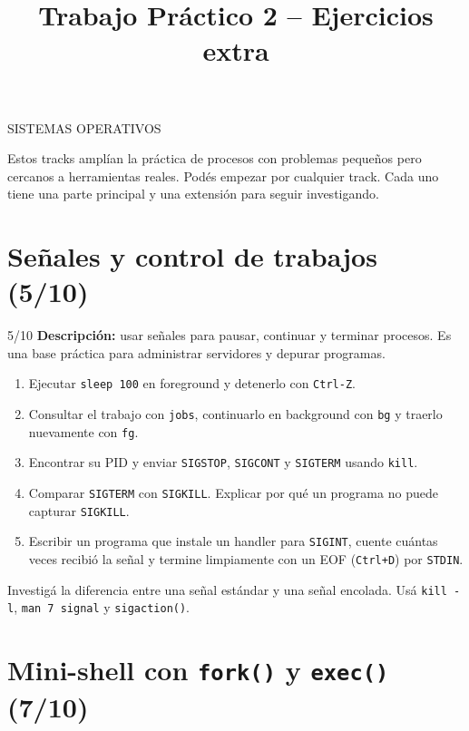 \documentclass[11pt,a4paper]{article}
\title{Trabajo Práctico 2 -- Ejercicios extra}
\author{}
\date{}
\begin{document}
\renewcommand{\contentsname}{Tracks}
\maketitle
\thispagestyle{fancy}
\begin{center}
SISTEMAS OPERATIVOS
\end{center}
\newpage

\tableofcontents
\newpage

Estos tracks amplían la práctica de procesos con problemas pequeños pero cercanos a herramientas reales. Podés empezar por cualquier track. Cada uno tiene una parte principal y una extensión para seguir investigando.

\section{Señales y control de trabajos (5/10)}

\begin{trackbox}{5/10}
\textbf{Descripción:} usar señales para pausar, continuar y terminar procesos. Es una base práctica para administrar servidores y depurar programas.
\end{trackbox}

\begin{enumerate}
  \item Ejecutar \texttt{sleep 100} en foreground y detenerlo con \texttt{Ctrl-Z}.
  \item Consultar el trabajo con \texttt{jobs}, continuarlo en background con \texttt{bg} y traerlo nuevamente con \texttt{fg}.
  \item Encontrar su PID y enviar \texttt{SIGSTOP}, \texttt{SIGCONT} y \texttt{SIGTERM} usando \texttt{kill}.
  \item Comparar \texttt{SIGTERM} con \texttt{SIGKILL}. Explicar por qué un programa no puede capturar \texttt{SIGKILL}.
  \item Escribir un programa que instale un handler para \texttt{SIGINT}, cuente cuántas veces recibió la señal y termine limpiamente con un EOF (\texttt{Ctrl+D}) por \texttt{STDIN}.
\end{enumerate}

\begin{extrabox}
Investigá la diferencia entre una señal estándar y una señal encolada. Usá \texttt{kill -l}, \texttt{man 7 signal} y \texttt{sigaction()}.
\end{extrabox}

\newpage
\section{Mini-shell con \texttt{fork()} y \texttt{exec()} (7/10)}
\end{document}
